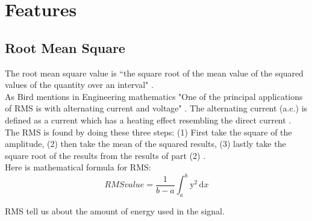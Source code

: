 \section{Features}
\subsection{Root Mean Square}
The root mean square value is “the square root of the mean value of the squared values of the quantity over an interval"  \citep{Bird2007}.
\\
As Bird mentions in Engineering mathematics "One of the principal applications of RMS is with alternating current and voltage" \citep{Bird2007}. The alternating current (a.c.) is defined as a current which has a heating effect resembling the direct current \citep{Bird2007}.
\\
The RMS is found by doing these three steps:
(1) First take the square of the amplitude, (2) then take the mean of the squared results, (3) lastly take the square root of the results from the results of part (2) \citep{Bird2007}. \\ Here is \citep{Bird2007} mathematical formula for RMS:
\begin{equation}\label{eq:RMS formular}
RMS value = \frac{1}{b-a}\int_a^b\mathrm{y}^{2}\,\mathrm{d}x
\end{equation}

RMS tell us about the amount of energy used in the signal.

